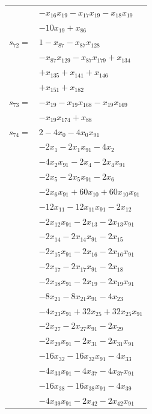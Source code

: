 \begin{longtable}{@{}r@{\;}l@{}}
 & \(\displaystyle -x_{16}x_{19} -x_{17}x_{19} -x_{18}x_{19}\) \\
 & \(\displaystyle -10x_{19} +x_{86}\) \\[3pt]
\(s_{72}=\) & \(\displaystyle 1 -x_{87} -x_{87}x_{128}\) \\
 & \(\displaystyle -x_{87}x_{129} -x_{87}x_{179} +x_{134}\) \\
 & \(\displaystyle +x_{135} +x_{141} +x_{146}\) \\
 & \(\displaystyle +x_{151} +x_{182}\) \\[3pt]
\(s_{73}=\) & \(\displaystyle -x_{19} -x_{19}x_{168} -x_{19}x_{169}\) \\
 & \(\displaystyle -x_{19}x_{174} +x_{88}\) \\[3pt]
\(s_{74}=\) & \(\displaystyle 2 -4x_{0} -4x_{0}x_{91}\) \\
 & \(\displaystyle -2x_{1} -2x_{1}x_{91} -4x_{2}\) \\
 & \(\displaystyle -4x_{2}x_{91} -2x_{4} -2x_{4}x_{91}\) \\
 & \(\displaystyle -2x_{5} -2x_{5}x_{91} -2x_{6}\) \\
 & \(\displaystyle -2x_{6}x_{91} +60x_{10} +60x_{10}x_{91}\) \\
 & \(\displaystyle -12x_{11} -12x_{11}x_{91} -2x_{12}\) \\
 & \(\displaystyle -2x_{12}x_{91} -2x_{13} -2x_{13}x_{91}\) \\
 & \(\displaystyle -2x_{14} -2x_{14}x_{91} -2x_{15}\) \\
 & \(\displaystyle -2x_{15}x_{91} -2x_{16} -2x_{16}x_{91}\) \\
 & \(\displaystyle -2x_{17} -2x_{17}x_{91} -2x_{18}\) \\
 & \(\displaystyle -2x_{18}x_{91} -2x_{19} -2x_{19}x_{91}\) \\
 & \(\displaystyle -8x_{21} -8x_{21}x_{91} -4x_{23}\) \\
 & \(\displaystyle -4x_{23}x_{91} +32x_{25} +32x_{25}x_{91}\) \\
 & \(\displaystyle -2x_{27} -2x_{27}x_{91} -2x_{29}\) \\
 & \(\displaystyle -2x_{29}x_{91} -2x_{31} -2x_{31}x_{91}\) \\
 & \(\displaystyle -16x_{32} -16x_{32}x_{91} -4x_{33}\) \\
 & \(\displaystyle -4x_{33}x_{91} -4x_{37} -4x_{37}x_{91}\) \\
 & \(\displaystyle -16x_{38} -16x_{38}x_{91} -4x_{39}\) \\
 & \(\displaystyle -4x_{39}x_{91} -2x_{42} -2x_{42}x_{91}\) \\

\end{longtable}
